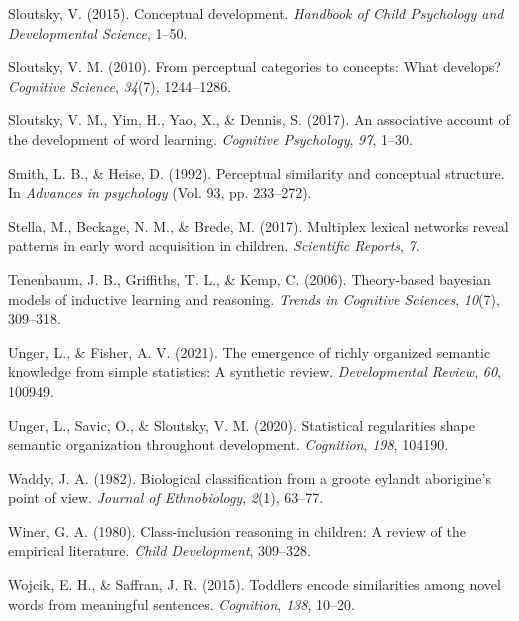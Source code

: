 \documentclass[english,,man]{apa6}
\begin{document}
\leavevmode\hypertarget{ref-sloutsky2015}{}%
Sloutsky, V. (2015). Conceptual development. \emph{Handbook of Child Psychology and Developmental Science}, 1--50.

\leavevmode\hypertarget{ref-sloutsky2010}{}%
Sloutsky, V. M. (2010). From perceptual categories to concepts: What develops? \emph{Cognitive Science}, \emph{34}(7), 1244--1286.

\leavevmode\hypertarget{ref-sloutsky2017}{}%
Sloutsky, V. M., Yim, H., Yao, X., \& Dennis, S. (2017). An associative account of the development of word learning. \emph{Cognitive Psychology}, \emph{97}, 1--30.

\leavevmode\hypertarget{ref-smith1992}{}%
Smith, L. B., \& Heise, D. (1992). Perceptual similarity and conceptual structure. In \emph{Advances in psychology} (Vol. 93, pp. 233--272).

\leavevmode\hypertarget{ref-stella2017}{}%
Stella, M., Beckage, N. M., \& Brede, M. (2017). Multiplex lexical networks reveal patterns in early word acquisition in children. \emph{Scientific Reports}, \emph{7}.

\leavevmode\hypertarget{ref-tenenbaum2006theory}{}%
Tenenbaum, J. B., Griffiths, T. L., \& Kemp, C. (2006). Theory-based bayesian models of inductive learning and reasoning. \emph{Trends in Cognitive Sciences}, \emph{10}(7), 309--318.

\leavevmode\hypertarget{ref-unger2021}{}%
Unger, L., \& Fisher, A. V. (2021). The emergence of richly organized semantic knowledge from simple statistics: A synthetic review. \emph{Developmental Review}, \emph{60}, 100949.

\leavevmode\hypertarget{ref-unger2020statistical}{}%
Unger, L., Savic, O., \& Sloutsky, V. M. (2020). Statistical regularities shape semantic organization throughout development. \emph{Cognition}, \emph{198}, 104190.

\leavevmode\hypertarget{ref-waddy1982}{}%
Waddy, J. A. (1982). Biological classification from a groote eylandt aborigine's point of view. \emph{Journal of Ethnobiology}, \emph{2}(1), 63--77.

\leavevmode\hypertarget{ref-winer1980class}{}%
Winer, G. A. (1980). Class-inclusion reasoning in children: A review of the empirical literature. \emph{Child Development}, 309--328.

\leavevmode\hypertarget{ref-wojcik2015}{}%
Wojcik, E. H., \& Saffran, J. R. (2015). Toddlers encode similarities among novel words from meaningful sentences. \emph{Cognition}, \emph{138}, 10--20.
\end{document}
